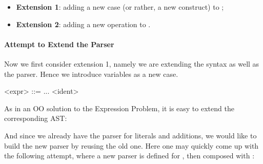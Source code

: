 

\begin{itemize}
\item \textbf{Extension 1}: adding a new case (or rather, a new construct) to ;
\item \textbf{Extension 2}: adding a new operation to .
\end{itemize}

\paragraph{Attempt to Extend the Parser} Now we first consider
extension 1, namely we are extending the syntax as well as the parser. Hence we introduce variables as a new case.

\setlength{\grammarindent}{5em}
\begin{grammar}
<expr> ::= ...
   \alt <ident>
\end{grammar}

As in an OO solution to the Expression Problem, it is easy to extend
the corresponding AST:


And since we already have the parser for literals and additions, we would
like to build the new parser by reusing the old one. Here one may quickly come up
with the following attempt, where a new parser is defined for , then composed
with :

